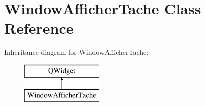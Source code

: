 \hypertarget{class_window_afficher_tache}{}\section{Window\+Afficher\+Tache Class Reference}
\label{class_window_afficher_tache}
Inheritance diagram for Window\+Afficher\+Tache\+:\begin{figure}[H]
\begin{center}
\leavevmode
\includegraphics[height=2.000000cm]{class_window_afficher_tache}
\end{center}
\end{figure}
